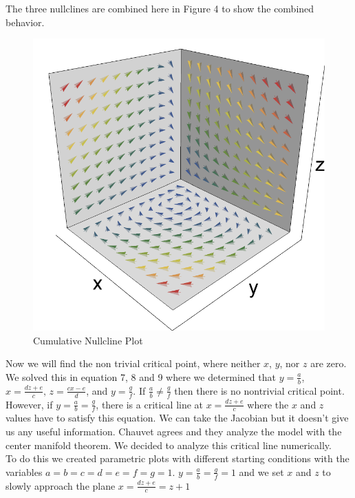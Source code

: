 \documentclass[11pt,oneside]{article}
\begin{document}
	The three nullclines are combined here in Figure 4 to show the combined behavior.
	\begin{figure}[H]
		\center
		\includegraphics[scale=0.80]{XYZ}
		\caption{Cumulative Nullcline Plot}
	\end{figure}
	
	Now we will find the non trivial critical point, where neither $x$, $y$, nor $z$ are zero. We solved this in equation 7, 8 and 9 where we determined that $y=\frac{a}{b}$, $x = \frac{dz + e}{c} \text{, } z = \frac{cx - e}{d}$, and $y=\frac{g}{f}$. If $\frac{a}{b} \neq \frac{g}{f}$ then there is no nontrivial critical point. However, if $y = \frac{a}{b} = \frac{g}{f}$, there is a critical line at $x = \frac{dz + e}{c}$ where the $x$ and $z$ values have to satisfy this equation. We can take the Jacobian but it doesn't give us any useful information. Chauvet agrees and they analyze the model with the center manifold theorem. We decided to analyze this critical line numerically.\\
	
	To do this we created parametric plots with different starting conditions with the variables $a=b=c=d=e=f=g=1$. $y = \frac{a}{b} = \frac{g}{f} = 1$ and we set $x$ and $z$ to slowly approach the plane $x = \frac{dz + e}{c} = z+1$\\
	
\end{document}
